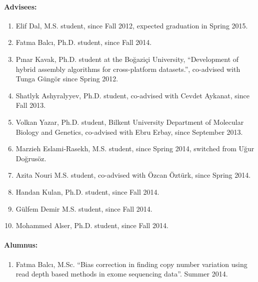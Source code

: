 


\paragraph{Advisees:}


\begin{enumerate}
\item Elif Dal, M.S. student, since Fall 2012, expected graduation in Spring 2015.
\item Fatma Balcı, Ph.D. student, since Fall 2014.
\item Pınar Kavak, Ph.D. student at the Boğaziçi University, “Development of hybrid assembly algorithms for cross-platform datasets.”, co-advised with Tunga Güngör since Spring 2012.
\item Shatlyk Ashyralyyev,  Ph.D. student, co-advised with Cevdet Aykanat, since Fall 2013.
\item Volkan Yazar,  Ph.D. student, Bilkent University Department of Molecular Biology and Genetics, co-advised with Ebru Erbay, since September 2013.
\item Marzieh Eslami-Rasekh, M.S. student, since Spring 2014, switched from Uğur Doğrusöz.
\item Azita Nouri M.S. student, co-advised with Özcan Öztürk, since Spring 2014.
\item Handan Kulan,  Ph.D. student, since Fall 2014.
\item Gülfem Demir M.S. student, since Fall 2014.
\item Mohammed Alser,  Ph.D. student, since Fall 2014.
\end{enumerate}

\paragraph{Alumnus:}

\begin{enumerate}
\item Fatma Balcı, M.Sc. “Bias correction in finding copy number variation using read depth based methods in exome sequencing data”. Summer 2014.
\end{enumerate}

